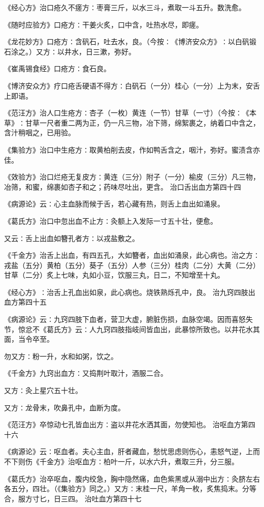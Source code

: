 \documentclass[a4paper,12pt,UTF8,twoside]{ctexbook}
\begin{document}
《经心方》治口疮久不瘥方∶枣膏三斤，以水三斗，煮取一斗五升。数洗愈。

《随时应验方》口疮方∶干姜火炙，口中含，吐热水尽，即瘥。

《龙花妙方》口疮方∶含矾石，吐去水，良。（今按∶《博济安众方》∶以白矾锻石涂之。）又方∶以井水，日三漱，弥好。

《崔禹锡食经》口疮方∶食石良。

《博济安众方》疗口疮舌硬语不得方∶白矾石（一分）桂心（一分）上为末，安舌上即语。

《范汪方》治人口生疮方∶杏子（一枚）黄连（一节）甘草（一寸）（今按∶《本草》∶甘草一尺者重二两为正，仍一凡三物，冶下筛，绵絮裹之，纳着口中含之，含汁稍咽之，已用验。

《集验方》治口中生疮方∶取黄柏削去皮，作如鸭舌含之，咽汁，弥好。蜜渍含亦佳。

《效验方》治口烂疮无复皮方∶黄连（三分）附子（一分）榆皮（三分）凡三物，冶筛，和蜜，绵裹如杏子和之；药味尽吐出，更含。
治口舌出血方第四十四

《病源论》云∶心主血脉而候于舌，若心藏有热，则舌上血出如涌泉。

《葛氏方》治口中忽出血不止方∶灸额上入发际一寸五十壮，便愈。

又云∶舌上出血如簪孔者方∶以戎盐敷之。

《千金方》治舌上出血，有四五孔，大如簪者，血出如涌泉，此心病也。治之方∶戎盐（五分）黄柏（五分）葵子（五分）人参（三分）桂肉（二分）大黄（二分）甘草（二分）炙上七味，丸如小豆，饮服三丸，日二，不知增至十丸。

《经心方》∶治舌上孔血出如泉，此心病也。烧铁熟烁孔中，良。
治九窍四肢出血方第四十五

《病源论》云∶九窍四肢下血者，营卫大虚，腑脏伤损，血脉空竭。因而喜怒失节，惊忿不《葛氏方》云∶人九窍四肢指岐间皆血出，此暴惊所致也。以井花水其面，当令卒至。

勿又方∶粉一升，水和如粥，饮之。

《千金方》九窍出血方∶又捣荆叶取汁，酒服二合。

又方∶灸上星穴五十壮。

又方∶龙骨末，吹鼻孔中，血断为度。

《范汪方》卒惊动七孔皆血出方∶盗以井花水洒其面，勿使知也。
治呕血方第四十六

《病源论》云∶呕血者。夫心主血，肝者藏血，愁忧思虑则伤心，恚怒气逆，上而不下则伤《千金方》治呕血方∶柏叶一斤，以水六升，煮取三升，分三服。

《葛氏方》治卒呕血，腹内绞急，胸中隐然痛，血色紫黑或从溺中出方∶灸脐左右各五分，四壮。（《集验方》同之。）又方∶末桂一尺，羊角一枚，炙焦捣末。分等合，服方寸匕，日三四。
治吐血方第四十七
\end{document}
